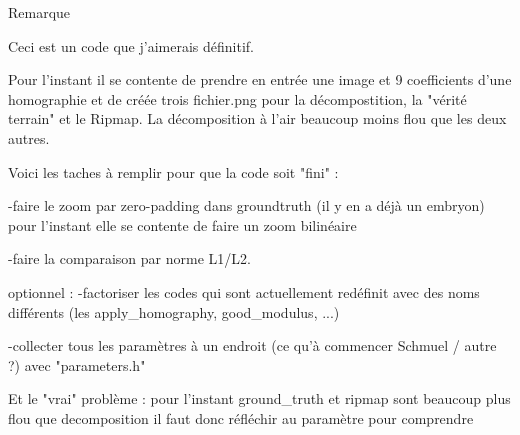 Remarque

Ceci est un code que j’aimerais définitif.

Pour l'instant il se contente de prendre en entrée une image et 9 coefficients d'une homographie et de créée trois fichier.png pour la décompostition, la "vérité terrain" et le Ripmap.
La décomposition à l'air beaucoup moins flou que les deux autres.



Voici les taches à remplir pour que la code soit "fini" :

	-faire le zoom par zero-padding dans groundtruth (il y en a déjà un embryon)
		pour l'instant elle se contente de faire un zoom bilinéaire
	
	-faire la comparaison par norme L1/L2.
	
	
	
optionnel :
	-factoriser les codes qui sont actuellement redéfinit avec des noms différents (les apply_homography, good_modulus, ...) 
	
	-collecter tous les paramètres à un endroit (ce qu'à commencer Schmuel / autre ?) avec "parameters.h"
	
	
	
Et le "vrai" problème :
	pour l'instant ground_truth et ripmap sont beaucoup plus flou que decomposition
	il faut donc réfléchir au paramètre pour comprendre
